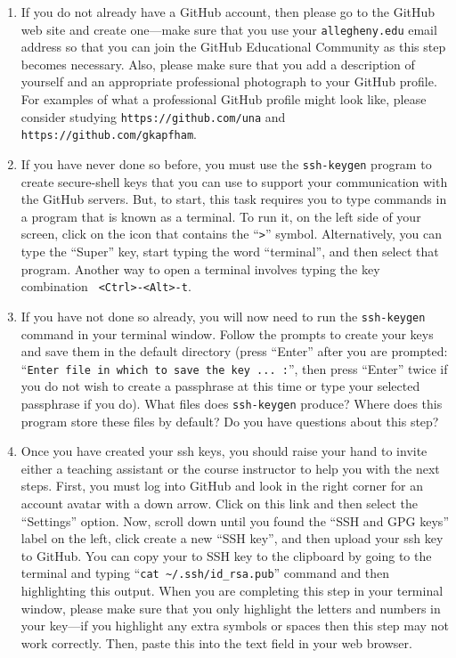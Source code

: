 \begin{enumerate}

  \item If you do not already have a GitHub account, then please go to the GitHub web site and create one---make
    sure that you use your {\tt allegheny.edu} email address so that you can join the GitHub Educational Community as
    this step becomes necessary. Also, please make sure that you add a description of yourself and an appropriate
    professional photograph to your GitHub profile. For examples of what a professional GitHub profile might look like,
    please consider studying {\tt https://github.com/una} and {\tt https://github.com/gkapfham}.

  \item If you have never done so before, you must use the {\tt ssh-keygen} program to create secure-shell keys that you
    can use to support your communication with the GitHub servers. But, to start, this task requires you to type
    commands in a program that is known as a terminal. To run it, on the left side of your screen, click on the icon
    that contains the ``{\tt >}'' symbol. Alternatively, you can type the ``Super'' key, start typing the word
    ``terminal'', and then select that program. Another way to open a terminal involves typing the key combination {\tt
    <Ctrl>-<Alt>-t}.

  \item If you have not done so already, you will now need to run the {\tt ssh-keygen} command in your terminal window.
    Follow the prompts to create your keys and save them in the default directory (press ``Enter'' after you are
    prompted: ``{\tt Enter file in which to save the key ...  :}'', then press ``Enter'' twice if you do not wish to
    create a passphrase at this time or type your selected passphrase if you do). What files does {\tt ssh-keygen}
    produce? Where does this program store these files by default? Do you have questions about this step?

  \item Once you have created your ssh keys, you should raise your hand to invite either a teaching assistant or the
    course instructor to help you with the next steps. First, you must log into GitHub and look in the right corner for
    an account avatar with a down arrow. Click on this link and then select the ``Settings'' option. Now, scroll down
    until you found the ``SSH and GPG keys'' label on the left, click create a new ``SSH key'', and then upload your ssh
    key to GitHub. You can copy your to SSH key to the clipboard by going to the terminal and typing ``{\tt cat
    \textasciitilde{}/.ssh/id\_rsa.pub}'' command and then highlighting this output. When you are completing this step
    in your terminal window, please make sure that you only highlight the letters and numbers in your key---if you
    highlight any extra symbols or spaces then this step may not work correctly. Then, paste this into the text field in
    your web browser.


\end{enumerate}
